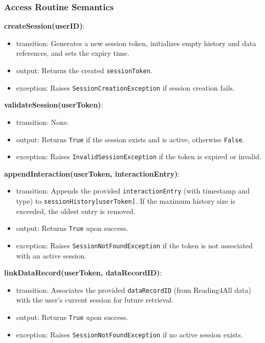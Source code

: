 \documentclass[12pt, titlepage]{article}
\begin{document}
\subsubsection{Access Routine Semantics}

\noindent \textbf{createSession(userID)}:
\begin{itemize}
  \item transition: Generates a new session token, initializes empty
    history and data references, and sets the expiry time.
  \item output: Returns the created \texttt{sessionToken}.
  \item exception: Raises \texttt{SessionCreationException} if
    session creation fails.
\end{itemize}

\noindent \textbf{validateSession(userToken)}:
\begin{itemize}
  \item transition: None.
  \item output: Returns \texttt{True} if the session exists and is
    active, otherwise \texttt{False}.
  \item exception: Raises \texttt{InvalidSessionException} if the
    token is expired or invalid.
\end{itemize}

\noindent \textbf{appendInteraction(userToken, interactionEntry)}:
\begin{itemize}
  \item transition: Appends the provided \texttt{interactionEntry}
    (with timestamp and type) to \texttt{sessionHistory[userToken]}.
    If the maximum history size is exceeded, the oldest entry is removed.
  \item output: Returns \texttt{True} upon success.
  \item exception: Raises \texttt{SessionNotFoundException} if the
    token is not associated with an active session.
\end{itemize}

\noindent \textbf{linkDataRecord(userToken, dataRecordID)}:
\begin{itemize}
  \item transition: Associates the provided \texttt{dataRecordID}
    (from Reading4All data) with the user’s current session for
    future retrieval.
  \item output: Returns \texttt{True} upon success.
  \item exception: Raises \texttt{SessionNotFoundException} if no
    active session exists.
\end{itemize}
\end{document}
